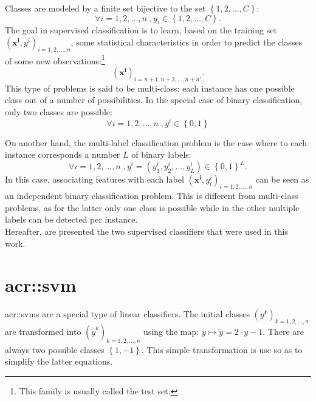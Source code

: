     Classes are modeled by a finite set bijective to the set \(\left\{1, 2, \dots, C\right\}\):
    \begin{equation*}
        \forall i = 1, 2, \dots, n \;, y_i \in \left\{1, 2, \dots, C\right\}.        
    \end{equation*}
    The goal in supervised classification is to learn, based on the training set \(\left(\bm{x^i}, y^i\right)_{i = 1, 2, \dots, n}\), some statistical characteristics in order to predict the classes of some new observations:\footnote{This family is usually called the test set.}
    \begin{equation*}
        \left(\bm{x^i}\right)_{i=n + 1, n + 2, \dots, n + n'}.
    \end{equation*}
    This type of problems is said to be multi-class: each instance has one possible class out of a number of possibilities.
    In the special case of binary classification, only two classes are possible:
    \begin{equation*}
        \forall i = 1, 2, \dots, n \;, y^i \in \left\{0, 1\right\}
    \end{equation*}

    On another hand, the multi-label classification problem is the case where to each instance corresponds a number $L$ of binary labels:
    \begin{equation*}
        \forall i = 1, 2, \dots, n \;, y^i = (y^i_1, y^i_2, \dots, y^i_L) \in \left\{0, 1\right\}^L.
    \end{equation*}
    In this case, associating features with each label \(\left(\bm{x^i}, y^i_l\right)_{i = 1, 2, \dots, n}\) can be seen as an independent binary classification problem.
    This is different from multi-class problems, as for the latter only one class is possible while in the other multiple labels can be detected per instance.\\

    Hereafter, are presented the two supervised classifiers that were used in this work.

\section{\acrlong*{acr::svm}}
    \label{sec::classifiers::svm}
    \glspl{acr::svm} are a special type of linear classifiers.
    The initial classes $\left(y^k\right)_{k=1, 2, \dots, n}$ are transformed into $\left(\tilde{y}^k\right)_{k=1, 2, \dots, n}$ using the map: $y \mapsto \tilde{y} = 2\cdot y - 1$.
    There are always two possible classes $\left\{1, -1\right\}$.
    This simple transformation is use so as to simplify the latter equations.

